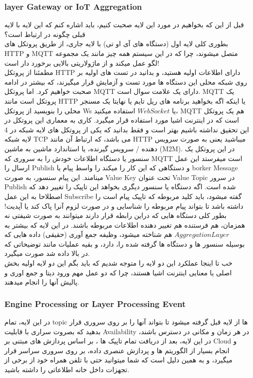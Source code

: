 \documentclass[10pt, a4paper]{article}
\begin{document}
\subsubsection{layer Gateway or IoT Aggregation}
قبل از این که بخواهیم در مورد این لایه صحبت کنیم، باید اشاره کنم که این لایه با لایه قبلی چگونه در ارتباط است؟\\
بطوری کلی لایه اول (دستگاه های آی او تی) با لایه جاری، از طریق پروتکل های HTTP و MQTT متصل میشوند، چرا که در این سیستم همه چیز مانند یک مجموعه لگو عمل میکند و از ماژولاریتی بالایی برخورد دار است!\\
مطمئنا از پروتکل HTTP دارای اطلاعات اولیه هستید، و بدانید در تست های اولیه بر روی شبکه محلی این دستگاه ها مورد تست و آزمایش قرار میگیرند، که بیشتر در ادامه صحبت خواهیم کرد. اما پروتکل MQTT دارای یک علامت سوال است. MQTT يک پروتکل است مانند HTTP يا اينکه اگه بخواهيد برنامه های ریل تایم یا نهایتا یک مسنجر محلی را بنویسید از پروتکل Ws یا $Web Socket$ استفاده میکنید، MQTT هم یک پروتکل است که در اینترنت اشیا مورد استفاده قرار میگیرد. کاری به معماری این پروتکل در این تحقیق نداشته باشیم بهتر است و فقط بدانید که یکی از پروتکل های لایه شبکه در 4 لایه شبکه TCP می باشد، که ارتباط آن مانند HTTP میباشید یعنی به صورت سرویس دهنده / سرویس گیرنده، یا استاندارد ماشین به ماشین (M2M). در این پروتکل یک سنسور یا دستگاه اطلاعات خودش را به سروری که MQTT است میفرستد این عمل ارسال را Publish و دستگاهی که این کار را میکند را واسط پیام یا borker Message مینامند. این پیام سنسور، به صورت Value Key تحت عنوان Value Topic در سرور Publish شده است. اگه دستگاه یا سنسور دیگری بخواهد این تاپیک را تغییر دهد که اصطلاحا به این عمل Subscribe گفته میشود، باید کلید مربوطه که تاپیک پیام است را داشته باشد تا بتواند پیام مربوطه را شناسایی و در صورت لزوم آنرا پاک کند یا آپدیت! بطور کلی دستگاه هایی که دراین رابطه قرار دارند میتوانند به صورت شیفتی نه همزمان، هم فرستنده هم تغییر دهنده اطلاعات مربوطه باشند.
در این لایه که بیشتر به $Aggregation Layer$ هم شناخته میشود، وظیفه جمع آوری (حقیقی) داده هایی که بوسیله سنسور ها و دستگاه ها گرفته شده را، دارد، و بقیه عملیات مانند توضیحاتی که در بالا داده شد صورت میگیرد.\\

خب تا اینجا عملکرد این دو لایه را متوجه شدیم که باید بگم این دو لایه اولیه بخش اصلی یا معنایی اینترنت اشیا هستند، چرا که دو عمل مهم ورود دیتا و جمع اوری و پالیش آنها را انجام میدهند.\\

\subsubsection{Engine Processing or Layer Processing Event}
در این لایه، تمام topic ها از لایه قبل گرفته میشود تا بتواند آنها را بر روی سروری قرار بدهید که بصروت سراری با قابلیت Availability در هر زمان و مکانی در دسترس باشند، در این لایه، بعد از دریافت تمام تاپیک ها ، بر اساس پردازش های مبتنی بر Cloud و انجام بسیار از الگوریتم ها و پردازش عنصری داده، بر روی سروری سراسر قرار میگیرد، و به همین دلیل است که شما میتوانید حتی با تلفن همراه خود از برخی از تجهزات داخل خانه اطلاعاتی را داشته باشید.
\end{document}
